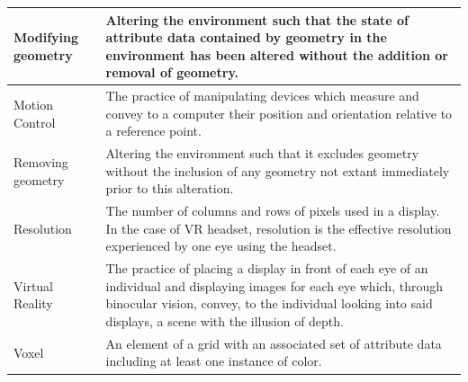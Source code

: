 \documentclass[onecolumn, draftclsnofoot,10pt, compsoc]{IEEEtran}
\newcounter{threesection}[subsubsection]
\begin{document}
\begin{longtable}{ | l | p{12cm} | }
Modifying geometry & Altering the environment such that the state of attribute data contained by geometry in the environment has been altered without the addition or removal of geometry.  \\ \hline
Motion Control & The practice of manipulating devices which measure and convey to a computer their position and orientation relative to a reference point.  \\ \hline
Removing geometry & Altering the environment such that it excludes geometry without the inclusion of any geometry not extant immediately prior to this alteration.  \\ \hline
Resolution & The number of columns and rows of pixels used in a display. In the case of  VR headset, resolution is the effective resolution experienced by one eye using the headset. \\ \hline
Virtual Reality & The practice of placing a display in front of each eye of an individual and displaying images for each eye which, through binocular vision, convey, to the individual looking into said displays, a scene with the illusion of depth.  \\ \hline
Voxel & An element of a grid with an associated set of attribute data including at least one instance of color.  \\ \hline
 
\hline 
\end{longtable}
\end{document}
